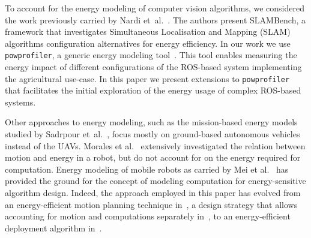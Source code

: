 \documentclass[conference]{IEEEtran}
\newcommand{\stt}[1]{{\small\tt #1}} %
\newcommand{\powprof}{\stt{powprofiler}}
\begin{document}



%
To account for the energy modeling of computer vision algorithms, we
considered the work previously carried by Nardi
et~al.~\cite{nardi2015introducing}. The authors present SLAMBench, a
framework that investigates Simultaneous Localisation and Mapping (SLAM) algorithms configuration alternatives
for energy efficiency. In our work we use \powprof{}, a generic energy
modeling tool~\cite{seewald2019coarse}. This tool enables measuring
the energy impact of different configurations of the ROS-based system
implementing the agricultural use-case. In this paper we present
extensions to \powprof{} that facilitates the initial exploration of
the energy usage of complex ROS-based systems.


Other approaches to energy modeling, such as the mission-based energy
models studied by Sadrpour et~al.~\cite{sadrpour2013experimental,
  sadrpour2013mission}, focus mostly on ground-based autonomous
vehicles instead of the UAVs. Morales et al.~\cite{morales2009power}
extensively investigated the relation between motion and energy in a
robot, but do not account for on the energy required for computation.
%
Energy modeling of mobile robots as carried by Mei et
al.~\cite{mei2006deployment, mei2005case, mei2004energy} has provided
the ground for the concept of modeling computation for
energy-sensitive algorithm design. Indeed, the approach employed in this paper has evolved
from an energy-efficient motion planning technique
in~\cite{mei2004energy}, a design strategy that allows accounting for
motion and computations separately in~\cite{mei2005case}, to an
energy-efficient deployment algorithm in~\cite{mei2006deployment}.

\end{document}
